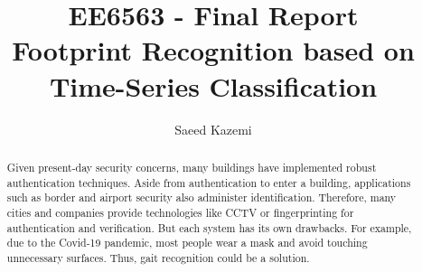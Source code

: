 \begin{frontmatter}
\title{\Huge EE6563 - Final Report\\Footprint Recognition based on \\ Time-Series Classification }

\author{Saeed Kazemi}
\address{University of New Brunswick}


\begin{abstract}
Given present-day security concerns, many buildings have implemented robust authentication techniques. Aside from authentication to enter a building, applications such as border and airport security also administer identification. Therefore, many cities and companies provide technologies like CCTV or fingerprinting for authentication and verification. But each system has its own drawbacks. For example, due to the Covid-19 pandemic, most people wear a mask and avoid touching unnecessary surfaces. Thus, gait recognition could be a solution. 








\end{abstract}
\end{frontmatter}
